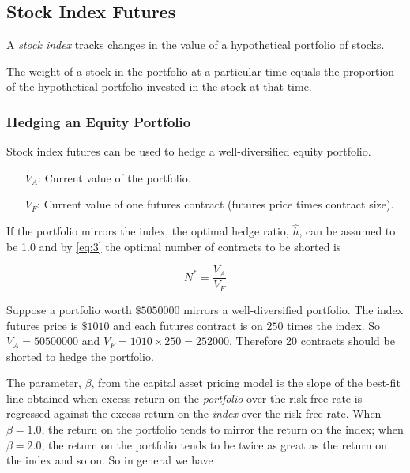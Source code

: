 \subsection{Stock Index Futures}
\bigskip

\begin{definition}
    A \emph{stock index} tracks changes in the value of a hypothetical portfolio of stocks.
\end{definition}

The weight of a stock in the portfolio at a particular time equals the proportion of the hypothetical portfolio invested in the stock at that time.

\subsubsection*{Hedging an Equity Portfolio}

Stock index futures can be used to hedge a well-diversified equity portfolio.
\begin{definition}
    \hphantom{Define:}
    \begin{enumerate}
        \item[\(V_{A}\):] Current value of the portfolio.
        \item[\(V_{F}\):] Current value of one futures contract (futures  price times contract size).
    \end{enumerate}
\end{definition}

If the portfolio mirrors the index, the optimal hedge ratio, \(\hat{h}\), can be assumed to be 1.0 and by \eqref{eq:3} the optimal number of contracts to be shorted is

\begin{equation}
    N^{*}=\frac{V_{A}}{V_{F}}
\end{equation}

\begin{eg}
    Suppose a portfolio worth \(\$\num{5050000}\) mirrors a well-diversified portfolio. The index futures price is \(\$1010\) and each futures contract is on \(250\) times the index. So \(V_{A}=\num{50500000}\) and \(V_{F}=1010 \times 250=\num{252000}\). Therefore 20 contracts should be shorted to hedge the portfolio.
\end{eg}

The parameter, \(\beta\), from the capital asset pricing model is the slope of the best-fit line obtained when excess return on the \emph{portfolio} over the risk-free rate is regressed against the excess return on the \emph{index} over the risk-free rate. When \(\beta=1.0\), the return on the portfolio tends to mirror the return on the index; when \(\beta=2.0\), the return on the portfolio tends to be twice as great as the return on the index and so on. So in general we have

